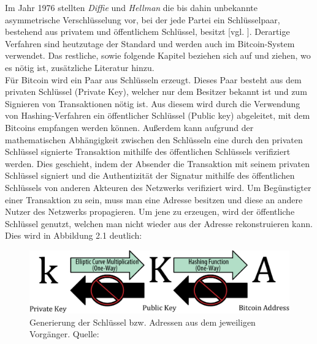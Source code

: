 Im Jahr 1976 stellten \emph{Diffie} und \emph{Hellman} die bis dahin unbekannte asymmetrische Verschlüsselung vor, bei der jede Partei ein Schlüsselpaar, bestehend aus privatem und öffentlichem Schlüssel, besitzt [vgl. \cite{diffie_hellman_1976}]. 
Derartige Verfahren sind heutzutage der Standard und werden auch im Bitcoin-System verwendet. Das restliche, sowie folgende Kapitel beziehen sich auf \cite{antanopoulos_2014} und ziehen, wo es nötig ist, zusätzliche Literatur hinzu.\\

Für Bitcoin wird ein Paar aus Schlüsseln erzeugt. 
Dieses Paar besteht aus dem privaten Schlüssel (Private Key), welcher nur dem Besitzer bekannt ist und zum Signieren von Transaktionen nötig ist.
Aus diesem wird durch die Verwendung von Hashing-Verfahren ein öffentlicher Schlüssel (Public key) abgeleitet, mit dem Bitcoins empfangen werden können.
Außerdem kann aufgrund der mathematischen Abhängigkeit zwischen den Schlüsseln eine durch den privaten Schlüssel signierte Transaktion mithilfe des öffentlichen Schlüssels verifiziert werden. Dies geschieht, indem der Absender die Transaktion mit seinem privaten Schlüssel signiert und die Authentizität der Signatur mithilfe des öffentlichen Schlüssels von anderen Akteuren des Netzwerks verifiziert wird. Um Begünstigter einer Transaktion zu sein, muss man eine Adresse besitzen und diese an andere Nutzer des Netzwerks propagieren. Um jene zu erzeugen, wird der öffentliche Schlüssel genutzt, welchen man nicht wieder aus der Adresse rekonstruieren kann. Dies wird in Abbildung 2.1 deutlich:
\begin{figure}[htpb]
	\centering
	\includegraphics[width=\textwidth]{images/public_and_private_key.png}
	\caption{Generierung der Schlüssel bzw. Adressen aus dem jeweiligen Vorgänger. 
	Quelle: \cite[57]{antanopoulos_2014}}
	\label{6braun:fig:keys}
\end{figure}
